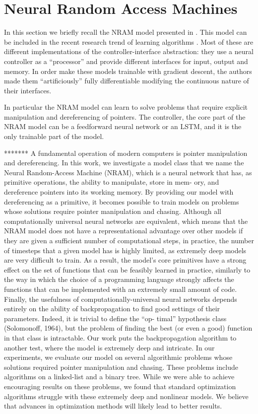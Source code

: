 \section{Neural Random Access Machines}
In this section we briefly recall the NRAM model presented in \cite{NRAM:2016}.  
This model can be included in the recent research trend of learning algorithms \cite{Graves2014NeuralTM,Joulin2015InferringAP,others}.
Most of these are different implementations of the controller-interface abstraction: they use a neural controller as a ``processor'' and provide different interfaces for input, output and memory. In order make these models trainable with gradient descent, the authors made them ``artificiously'' fully differentiable modifying the continuous nature of their interfaces.

In particular the NRAM model can learn to solve problems that require explicit manipulation and dereferencing of pointers. 
 The controller, the core part of the NRAM model can be a feedforward neural network or an LSTM, and it is the only
trainable part of the model.


*******
A fundamental operation of modern computers is pointer manipulation and dereferencing.  In this
work, we investigate a model class that we name the Neural Random-Access Machine (NRAM),
which is a neural network that has, as primitive operations, the ability to manipulate, store in mem-
ory, and dereference pointers into its working memory. By providing our model with dereferencing
as a primitive,  it becomes possible to train models on problems whose solutions require pointer
manipulation and chasing.  Although all computationally universal neural networks are equivalent,
which means that the NRAM model does not have a representational advantage over other models if
they are given a sufficient number of computational steps, in practice, the number of timesteps that
a given model has is highly limited, as extremely deep models are very difficult to train. As a result,
the model’s core primitives have a strong effect on the set of functions that can be feasibly learned
in practice, similarly to the way in which the choice of a programming language strongly affects the
functions that can be implemented with an extremely small amount of code.
Finally, the usefulness of computationally-universal neural networks depends entirely on the ability
of backpropagation to find good settings of their parameters.  Indeed, it is trivial to define the “op-
timal” hypothesis class (Solomonoff, 1964), but the problem of finding the best (or even a good)
function in that class is intractable.  Our work puts the backpropagation algorithm to another test,
where the model is extremely deep and intricate.
In our experiments, we evaluate our model on several algorithmic problems whose solutions required
pointer manipulation and chasing. These problems include algorithms on a linked-list and a binary
tree. While we were able to achieve encouraging results on these problems, we found that standard
optimization algorithms struggle with these extremely deep and nonlinear models.  We believe that
advances in optimization methods will likely lead to better results.